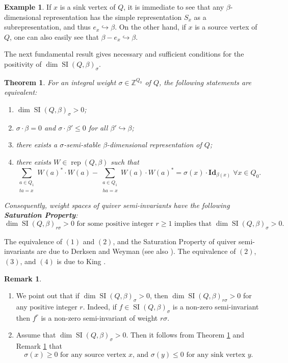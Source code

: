 \documentclass[11pt]{article}
\newtheorem{theorem}[theo]{Theorem}
\theoremstyle{definition}
\newtheorem{exam}[theo]{Example}
\newtheorem{rema}[theo]{Remark}
\numberwithin{equation}{section}
\newcommand{\rep}{\operatorname{rep}}
\newcommand{\SI}{\operatorname{SI}}
\newcommand{\ZZ}{\mathbb Z}
\newcommand{\Id}{\mathbf{Id}}
\begin{document}
\begin{exam}\label{dim-sub-vectors-sinks-sources} If $x$ is a sink vertex of $Q$, it is immediate to see that any $\beta$-dimensional representation has the simple representation $S_x$ as a subrepresentation, and thus $e_x \hookrightarrow \beta$. On the other hand, if $x$ is a source vertex of $Q$, one can also easily see that $\beta-e_x \hookrightarrow \beta$.
\end{exam}

The next fundamental result gives necessary and sufficient conditions for the positivity of $\dim \SI(Q, \beta)_{\sigma}$.

\begin{theorem}\label{King-criterion} For an integral weight $\sigma \in \ZZ^{Q_0}$ of $Q$, the following statements are equivalent:

\begin{enumerate}
\item $\dim \SI(Q, \beta)_\sigma>0$;

\item $\sigma \cdot \beta=0$ and $\sigma \cdot \beta' \leq 0$ for all $\beta' \hookrightarrow \beta$;

\item there exists a $\sigma$-semi-stable $\beta$-dimensional representation of $Q$;

\item there exists $W \in \rep(Q, \beta)$ such that 
	\[
	\sum_{\substack{a \in Q_1 \\ ta=x}} W(a)^* \cdot W(a) - \sum_{\substack{a \in Q_1 \\ ha=x}} W(a) \cdot W(a)^* = \sigma(x) \cdot \Id_{\beta(x)} \; \forall x \in Q_0.
	\]
\end{enumerate}

Consequently, weight spaces of quiver semi-invariants have the following \textbf{Saturation Property}:
$$
\dim \SI(Q, \beta)_{r\sigma}>0 \text{~for some positive integer~} r \geq 1 \text{~implies that~} \dim \SI(Q, \beta)_{\sigma}>0.
$$
\end{theorem}

The equivalence of $(1)$ and $(2)$, and the Saturation Property of quiver semi-invariants are due to Derksen and Weyman \cite{DW1} (see also \cite{CB}). The equivalence of $(2)$, $(3)$, and $(4)$ is due to King \cite{K}.


\begin{rema} \ \label{wt-sign-at-sources-sinks} 
\begin{enumerate}
\item We point out that if $\dim \SI(Q, \beta)_{\sigma}>0$, then $\dim \SI(Q, \beta)_{r\sigma}>0$ for any positive integer $r$. Indeed, if $f \in \SI(Q, \beta)_\sigma$ is a non-zero semi-invariant then $f^r$ is a non-zero semi-invariant of weight $r\sigma$.

\item Assume that $\dim \SI(Q, \beta)_\sigma>0$. Then it follows from Theorem \ref{King-criterion} and Remark \ref{dim-sub-vectors-sinks-sources} that 
$$
\sigma(x) \geq 0 \text{~for any source vertex $x$,} \text{~and~} \sigma(y) \leq 0 \text{~for any sink vertex $y$}.
$$
\end{enumerate}
\end{rema}
\end{document}

